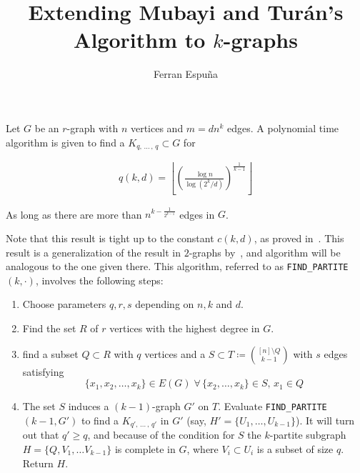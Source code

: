 \documentclass[12pt]{article}
\author{Ferran Espuña}
\date{} %
\begin{document}
    \title{Extending Mubayi and Turán's Algorithm to $k$-graphs}

    \maketitle

    Let $G$ be an $r$-graph with $n$ vertices and $m = dn^k$ edges.
    A polynomial time algorithm is given to find a $K_{q,\, \ldots\, ,\, q} \subset G$ for

    \begin{align*}
        q (k, d) = \left\lfloor \left(  \frac{\log n}{\log (2^k/d)} \right)^{\frac{1}{k-1}} \right\rfloor
        \label{eq:q}
    \end{align*}

    As long as there are more than $n^{k-\frac{1}{2^{k-1}}}$ edges in $G$.
    
    Note that this result is tight up to the constant $c(k, d)$,
    as proved in~\cite{Erods1964}.
    This result is a generalization of the result in $2$-graphs by~\cite{MUBAYI2010174},
    and algorithm will be analogous to the one given there.
    This algorithm, referred to as \verb|FIND_PARTITE|$(k, \cdot)$, involves the following steps:

    \begin{enumerate}
        \item Choose parameters $q, r, s$ depending on $n, k$ and $d$. \label{step:choose_parameters}

        \item Find the set $R$ of $r$ vertices with the highest degree in $G$. \label{step:find_R}

        \item find a subset $Q \subset R$ with $q$ vertices and a
        $S \subset T \coloneqq \binom{[n] \setminus Q}{k-1}$ with $s$ edges satisfying
        \[\{x_1, x_2, \ldots, x_k\} \in E(G) \; \forall \, \{x_2, \ldots, x_k\} \in S, \, x_1 \in Q\] \label{step:find_Q_S}

        \item The set $S$ induces a $(k-1)$-graph $G'$ on $T$.
        Evaluate \verb|FIND_PARTITE|$(k-1, G')$ to find a $K_{q',\, \ldots\, ,\, q'}$ in $G'$
        (say, $H' = \{U_1, \ldots, U_{k-1}\}$). It will turn out that $q' \geq q$,
        and because of the condition for $S$ the $k$-partite subgraph $H = \{Q, V_1, \ldots V_{k-1}\}$
        is complete in $G$, where $V_i \subset U_i$ is a subset of size $q$.
        Return $H$.

    \end{enumerate}
\end{document}
